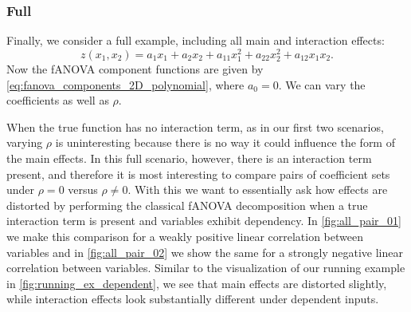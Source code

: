 \subsubsection{Full}
Finally, we consider a full example, including all main and interaction effects:
$$z(x_1, x_2) = a_1 x_1 + a_2 x_2 + a_{11} x_1^2 + a_{22} x_2^2 + a_{12} x_1 x_2.$$
Now the fANOVA component functions are given by \autoref{eq:fanova_components_2D_polynomial}, where $a_0 = 0$.
We can vary the coefficients as well as $\rho$.\par
When the true function has no interaction term, as in our first two scenarios, varying $\rho$ is uninteresting because there is no way it could influence the form of the main effects. In this full scenario, however, there is an interaction term present, and therefore it is most interesting to compare pairs of coefficient sets under $\rho = 0$ versus $\rho \neq 0$. With this we want to essentially ask how effects are distorted by performing the classical fANOVA decomposition when a true interaction term is present and variables exhibit dependency.
In \autoref{fig:all_pair_01} we make this comparison for a weakly positive linear correlation between variables and in \autoref{fig:all_pair_02} we show the same for a strongly negative linear correlation between variables. Similar to the visualization of our running example in \autoref{fig:running_ex_dependent}, we see that main effects are distorted slightly, while interaction effects look substantially different under dependent inputs.

